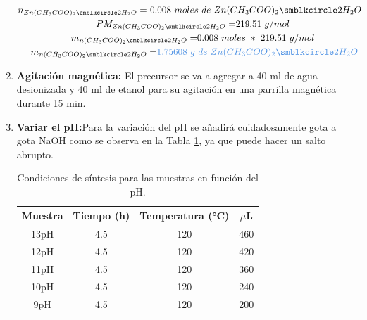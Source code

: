\documentclass[12pt]{article}
\begin{document}
\begin{enumerate}
            
        \begin{gather}
        {\displaystyle n_{Zn(CH_{3} COO)_{2} \smblkcircle 2H_{2} O} =} \ {\displaystyle 0.008\ moles\ de\ Zn(CH_{3} COO)_{2} \smblkcircle 2H_{2} O} \ \ \ \\
        {\displaystyle PM_{Zn(CH_{3} COO)_{2} \smblkcircle 2H_{2} O} =} 219.51\ g/mol\ \\
        {\displaystyle m_{n(CH_{3} COO)_{2} \smblkcircle 2H_{2} O} =} 0.008\ moles\ *\ 219.51\ g/mol\ \\
        {\displaystyle m_{n(CH_{3} COO)_{2} \smblkcircle 2H_{2} O} =}\textcolor[rgb]{0.29,0.56,0.89}{1.75608\ g\ de{\displaystyle \ Zn(CH_{3} COO)_{2} \smblkcircle 2H_{2} O}}
        \end{gather}
          \item\textbf{Agitación magnética:} El precursor se va a agregar a 40 ml de agua desionizada y 40 ml de etanol para su agitación en una parrilla magnética durante 15 min.
          
         \item\textbf{Variar el pH:}Para la variación del pH se añadirá cuidadosamente gota a gota NaOH como se observa en la Tabla \ref{tab:PHZNO}, ya que puede hacer un salto abrupto. 
                 \begin{table}[h!]
            \centering
            \caption{Condiciones de síntesis para las muestras en función del pH.}
            \begin{tabular}{|c|c|c|c|}
                \hline
                Muestra & Tiempo (h) & Temperatura (°C) & \(\mu\)L \\
                \hline
                13pH & 4.5 & 120 & 460 \\
                12pH & 4.5 & 120 & 420 \\
                11pH & 4.5 & 120 & 360 \\
                10pH & 4.5 & 120 & 240 \\
                9pH  & 4.5 & 120 & 200 \\
                \hline
            \end{tabular}
            \label{tab:PHZNO}
        \end{table}


\end{enumerate}
\end{document}
